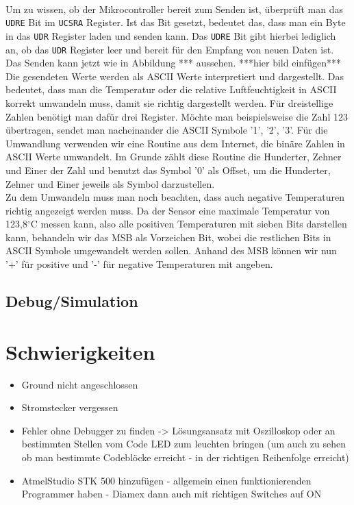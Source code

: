 \documentclass[]{article}
\begin{document}
\\Um zu wissen, ob der Mikrocontroller bereit zum Senden ist, überprüft man das \texttt{UDRE} Bit im \texttt{UCSRA} Register. Ist das Bit gesetzt, bedeutet das, dass man ein Byte in das \texttt{UDR} Register laden und senden kann. Das \texttt{UDRE} Bit gibt hierbei lediglich an, ob das \texttt{UDR} Register leer und bereit für den Empfang von neuen Daten ist. Das Senden kann jetzt wie in Abbildung *** aussehen. ***hier bild einfügen***
\\Die gesendeten Werte werden als ASCII Werte interpretiert und dargestellt. Das bedeutet, dass man die Temperatur oder die relative Luftfeuchtigkeit in ASCII korrekt umwandeln muss, damit sie richtig dargestellt werden. Für dreistellige Zahlen benötigt man dafür drei Register. Möchte man beispielsweise die Zahl 123 übertragen, sendet man nacheinander die ASCII Symbole '1', '2', '3'. Für die Umwandlung verwenden wir eine Routine aus dem Internet, die binäre Zahlen in ASCII Werte umwandelt. Im Grunde zählt diese Routine die Hunderter, Zehner und Einer der Zahl und benutzt das Symbol '0' als Offset, um die Hunderter, Zehner und Einer jeweils als Symbol darzustellen.
\\Zu dem Umwandeln muss man noch beachten, dass auch negative Temperaturen richtig angezeigt werden muss. Da der Sensor eine maximale Temperatur von 123,8$^\circ$C messen kann, also alle positiven Temperaturen mit sieben Bits darstellen kann, behandeln wir das MSB als Vorzeichen Bit, wobei die restlichen Bits in ASCII Symbole umgewandelt werden sollen. Anhand des MSB können wir nun '+' für positive und '-' für negative Temperaturen mit angeben.





\subsection{Debug/Simulation}

\section{Schwierigkeiten}
\begin{itemize}
	\item Ground nicht angeschlossen
	\item Stromstecker vergessen
	\item Fehler ohne Debugger zu finden -> Lösungsansatz mit Oszilloskop oder an bestimmten Stellen vom Code LED zum leuchten bringen (um auch zu sehen ob man bestimmte Codeblöcke erreicht - in der richtigen Reihenfolge erreicht)
	\item AtmelStudio STK 500 hinzufügen - allgemein einen funktionierenden Programmer haben - Diamex dann auch mit richtigen Switches auf ON 
\end{itemize}
\end{document}
